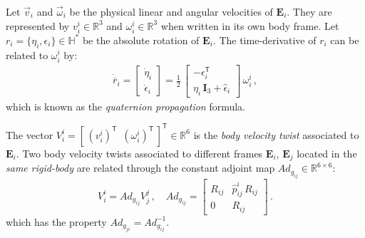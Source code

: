 Let $\vec{v}_{i}$ and $\vec{\omega}_{i}$ be the physical linear and angular velocities of $\mathbf{E}_{i}$. They are represented by 
$v^{i}_{i}\in\mathbb{R}^{3}$ and $\omega^{i}_{i}\in\mathbb{R}^{3}$ when written in its own body frame.
%
Let $r_i = \{\eta_i,\epsilon_i\}\in\mathbb{H}^*$ be the absolute rotation of $\mathbf{E}_i$. 
The time-derivative of $r_i$ can be related to $\omega^i_{i}$ by:
%
\begin{align}
\dot{\overline{r}}_i = 
%
\left[ \begin{array}{cc}
\dot{\eta}_i \\
\dot{\epsilon}_i 
\end{array} \right] = 
%
\frac{1}{2} \, \left[ \begin{array}{cc}
- \epsilon_i^\mathsf{T} \\
\eta_i\,\mathbf{I}_3 + \widehat{\epsilon}_i
\end{array} \right] \, \omega^i_{i} \,, 
\label{eq:quaternion_propagation}
\end{align}
%
which is known as the \textit{quaternion propagation} formula.

The vector $V^{i}_{i} = [\, (v^{i}_{i})^\mathsf{T} \,\,\, (\omega^{i}_{i})^\mathsf{T} \,]^\mathsf{T} \in \mathbb{R}^{6}$ is the \textit{body velocity twist} associated to $\mathbf{E}_{i}$.
%
Two body velocity twists associated to different frames $\mathbf{E}_i$, $\mathbf{E}_j$ located in the \textit{same rigid-body} are related through the constant adjoint map 
$Ad_{g_{ij}} \in \mathbb{R}^{6 \times 6}$:
%
\begin{equation}
V^{i}_{i} = Ad_{g_{ij}} V^{j}_{j} \,, \quad
%
Ad_{g_{ij}} =
\left[\begin{array}{cc}
R_{ij} & \hat{p}^{i}_{ij} \, R_{ij} \\
  0    &             R_{ij}
\end{array}\right] \,.
\label{eq:adjoint_map}
\end{equation}
%
which has the property $Ad_{g_{ji}} = Ad^{-1}_{g_{ij}}$.

